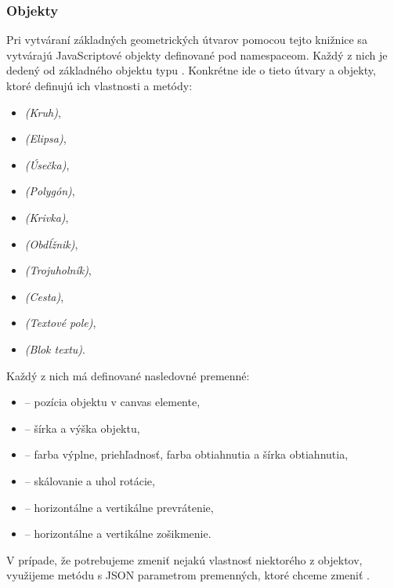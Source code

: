 \subsubsection{Objekty}

Pri vytváraní základných geometrických útvarov pomocou tejto knižnice sa vytvárajú JavaScriptové objekty definované pod  namespaceom. Každý z nich je dedený od základného  objektu typu . Konkrétne ide o tieto útvary a objekty, ktoré definujú ich vlastnosti a metódy:

\begin{itemize}
	\item {} \textit{(Kruh)},
	\item {} \textit{(Elipsa)},
	\item {} \textit{(Úsečka)},
	\item {} \textit{(Polygón)},
	\item {} \textit{(Krivka)},
	\item {} \textit{(Obdĺžnik)},
	\item {} \textit{(Trojuholník)},
	\item {} \textit{(Cesta)},
	\item {} \textit{(Textové pole)},
	\item {} \textit{(Blok textu)}.	
\end{itemize}  
Každý z nich má definované nasledovné premenné:
\begin{itemize}
	\item {} -- pozícia objektu v canvas elemente,
	\item {} -- šírka a výška objektu,
	\item {} -- farba výplne, priehľadnosť, farba obtiahnutia a šírka obtiahnutia,
	\item {} -- skálovanie a uhol rotácie,
	\item {} -- horizontálne a vertikálne prevrátenie,
	\item {} -- horizontálne a vertikálne zošikmenie.
\end{itemize}
V prípade, že potrebujeme zmeniť nejakú vlastnosť niektorého z objektov, využijeme metódu  s JSON parametrom premenných, ktoré chceme zmeniť .

